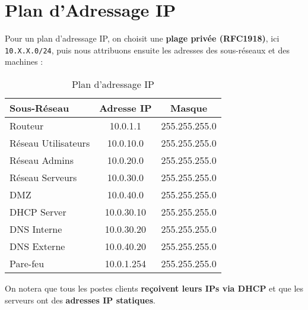 \documentclass[../Livrable1.tex]{subfiles}
\begin{document}
\section*{Plan d’Adressage IP}

Pour un plan d’adressage IP, on choisit une \textbf{plage privée (RFC1918)}, ici \texttt{10.X.X.0/24}, puis nous attribuons ensuite les adresses des sous-réseaux et des machines :

\begin{table}[h]
    \centering
    \begin{tabular}{|l|c|c|}
        \hline
        \textbf{Sous-Réseau} & \textbf{Adresse IP} & \textbf{Masque} \\
        \hline
        Routeur & 10.0.1.1 & 255.255.255.0 \\
        Réseau Utilisateurs & 10.0.10.0 & 255.255.255.0 \\
        Réseau Admins & 10.0.20.0 & 255.255.255.0 \\
        Réseau Serveurs & 10.0.30.0 & 255.255.255.0 \\
        DMZ & 10.0.40.0 & 255.255.255.0 \\
        DHCP Server & 10.0.30.10 & 255.255.255.0 \\
        DNS Interne & 10.0.30.20 & 255.255.255.0 \\
        DNS Externe & 10.0.40.20 & 255.255.255.0 \\
        Pare-feu & 10.0.1.254 & 255.255.255.0 \\
        \hline
    \end{tabular}
    \caption{Plan d’adressage IP}
\end{table}

On notera que tous les postes clients \textbf{reçoivent leurs IPs via DHCP} et que les serveurs ont des \textbf{adresses IP statiques}.
\end{document}
